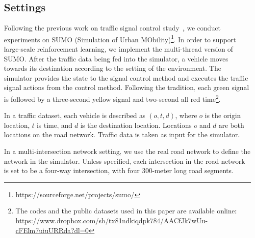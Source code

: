 \subsection{Settings}
Following the previous work on traffic signal control study~\cite{wei2018intellilight}, we conduct experiments on SUMO (Simulation of Urban MObility)\footnote{https://sourceforge.net/projects/sumo/}. In order to support large-scale reinforcement learning, we implement the multi-thread version of SUMO. After the traffic data being fed into the simulator, a vehicle moves towards its destination according to the setting of the environment. The simulator provides the state to the signal control method and executes the traffic signal actions from the control method. Following the tradition, each green signal is followed by a three-second yellow signal and two-second all red time\footnote{The codes and the public datasets used in this paper are available online: \url{https://www.dropbox.com/sh/tx81ndkiqdpk784/AACfJk7wUu-cFElm7uiuURRda?dl=0}}. 

In a traffic dataset, each vehicle is described as $(o, t, d)$, where $o$ is the origin location, $t$ is  time, and $d$ is the destination location. Locations $o$ and $d$ are both locations on the road network. Traffic data is taken as input for the simulator.

In a multi-intersection network setting, we use the real road network to define the network in the simulator. Unless specified, each intersection in the road network is set to be a four-way intersection, with four 300-meter long road segments. 


